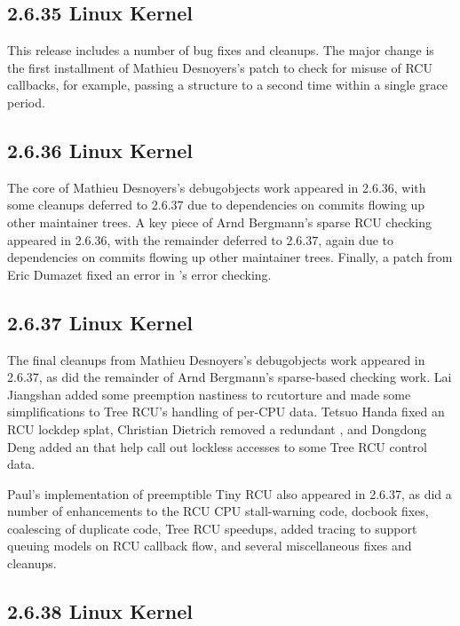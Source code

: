 \subsection{2.6.35 Linux Kernel}

This release includes a number of bug fixes and cleanups.
The major change is the first installment of Mathieu Desnoyers's
patch to check for misuse of RCU callbacks, for example, passing
a  structure to  a second time within
a single grace period.

\subsection{2.6.36 Linux Kernel}

The core of Mathieu Desnoyers's debugobjects work appeared in 2.6.36,
with some cleanups deferred to 2.6.37 due to dependencies on commits
flowing up other maintainer trees.
A key piece of Arnd Bergmann's sparse RCU checking appeared in 2.6.36,
with the remainder deferred to 2.6.37, again due to dependencies on
commits flowing up other maintainer trees.
Finally, a patch from Eric Dumazet fixed an error in
's error checking.

\subsection{2.6.37 Linux Kernel}

The final cleanups from Mathieu Desnoyers's debugobjects work appeared
in 2.6.37, as did the remainder of Arnd Bergmann's sparse-based checking work.
Lai Jiangshan added some preemption nastiness to rcutorture and
made some simplifications to Tree RCU's handling of per-CPU data.
Tetsuo Handa fixed an RCU lockdep splat, Christian Dietrich removed
a redundant , and Dongdong Deng added an
 that help call out lockless accesses to some
Tree RCU control data.

Paul's implementation of preemptible Tiny RCU also appeared in
2.6.37, as did a number of enhancements to the RCU CPU stall-warning
code, docbook fixes, coalescing of duplicate code, Tree RCU speedups,
added tracing to support queuing models on RCU callback flow,
and several miscellaneous fixes and cleanups.

\subsection{2.6.38 Linux Kernel}

